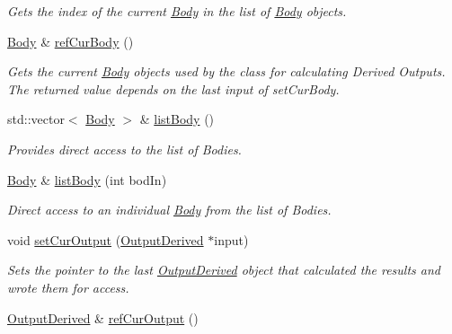 \begin{DoxyCompactItemize}
\begin{DoxyCompactList}\small\item\em Gets the index of the current \hyperlink{classosea_1_1ofreq_1_1_body}{Body} in the list of \hyperlink{classosea_1_1ofreq_1_1_body}{Body} objects. \end{DoxyCompactList}\item 
\hyperlink{classosea_1_1ofreq_1_1_body}{Body} \& \hyperlink{classosea_1_1ofreq_1_1_outputs_body_afdb3f49b84baf1a6b2de8a5d014abfe5}{ref\-Cur\-Body} ()
\begin{DoxyCompactList}\small\item\em Gets the current \hyperlink{classosea_1_1ofreq_1_1_body}{Body} objects used by the class for calculating Derived Outputs. The returned value depends on the last input of set\-Cur\-Body. \end{DoxyCompactList}\item 
std\-::vector$<$ \hyperlink{classosea_1_1ofreq_1_1_body}{Body} $>$ \& \hyperlink{classosea_1_1ofreq_1_1_outputs_body_a52d2c3942f90741a576d4f979cb1333b}{list\-Body} ()
\begin{DoxyCompactList}\small\item\em Provides direct access to the list of Bodies. \end{DoxyCompactList}\item 
\hyperlink{classosea_1_1ofreq_1_1_body}{Body} \& \hyperlink{classosea_1_1ofreq_1_1_outputs_body_a126aac91daccbc9a7dc39bc160bc34be}{list\-Body} (int bod\-In)
\begin{DoxyCompactList}\small\item\em Direct access to an individual \hyperlink{classosea_1_1ofreq_1_1_body}{Body} from the list of Bodies. \end{DoxyCompactList}\item 
void \hyperlink{classosea_1_1ofreq_1_1_outputs_body_af8cf39f2529bd1aa2e6f7987e3d59438}{set\-Cur\-Output} (\hyperlink{classosea_1_1ofreq_1_1_output_derived}{Output\-Derived} $\ast$input)
\begin{DoxyCompactList}\small\item\em Sets the pointer to the last \hyperlink{classosea_1_1ofreq_1_1_output_derived}{Output\-Derived} object that calculated the results and wrote them for access. \end{DoxyCompactList}\item 
\hyperlink{classosea_1_1ofreq_1_1_output_derived}{Output\-Derived} \& \hyperlink{classosea_1_1ofreq_1_1_outputs_body_a56090278e50472fd7aff1faa236a765d}{ref\-Cur\-Output} ()

\end{DoxyCompactItemize}

